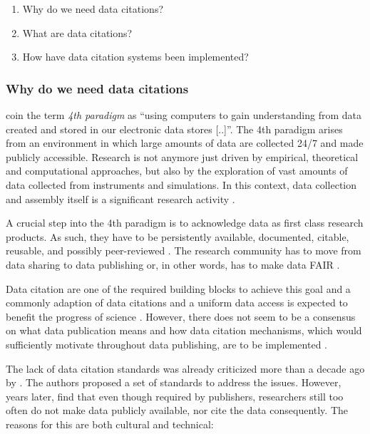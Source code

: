 \documentclass[a4paper,10pt]{article}
\begin{document}
\begin{enumerate}
 \item Why do we need data citations?
 \item What are data citations?
 \item How have data citation systems been implemented?
\end{enumerate}

\subsubsection{Why do we need data citations}    
\cite{Hey2009} coin the term \textit{4th paradigm} as ``using computers to gain understanding from data created and stored in our electronic data stores [..]''.
The 4th paradigm arises from an environment in which large amounts of data are collected 24/7 and made publicly accessible. Research is not anymore just driven by empirical, theoretical and computational approaches, but also by the exploration of vast amounts of data collected from instruments and simulations. In this context, data collection and assembly itself is a significant research activity \citep{Frew2012}.

A crucial step into the 4th paradigm is to acknowledge data as first class research products. As such, they have to be persistently available, documented, citable, reusable, and possibly peer-reviewed \citep{Callaghan2012, Kratz2014}. The research community has to move from data sharing to data publishing \citep{Costello2009, Kratz2014} or, in other words, has to make data \gls{FAIR} \citep{Wilkinson2016}. 

Data citation are one of the required building blocks to achieve this goal and a commonly adaption of data citations and a uniform data access is expected to benefit the progress of science \citep{CODATA2013}. However, there does not seem to be a consensus on what data publication means \citep{Kratz2014} and how data citation mechanisms, which would sufficiently motivate throughout data publishing, are to be implemented \citep{Costello2009}.

The lack of data citation standards was already criticized more than a decade ago by \cite{AltKin07}. The authors proposed a set of standards to address the issues. However, years later, \cite{Altman2015, Tenopir2011} find that even though required by publishers, researchers still too often do not make data publicly available, nor cite the data consequently. The reasons for this are both cultural and technical: 
\end{document}

